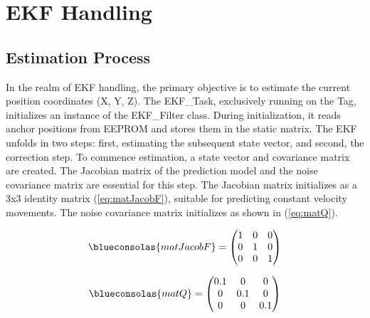 \chapter{EKF Handling}
\label{chap:EKF_Handling}

\section{Estimation Process}
\label{sec:Estimation_Process}

In the realm of EKF handling, the primary objective is to estimate the current position coordinates (X, Y, Z). The EKF\_Task, exclusively running on the Tag, initializes an instance of the EKF\_Filter class. During initialization, it reads anchor positions from EEPROM and stores them in the static  matrix.
\vspace{4pt}
\newline
The EKF unfolds in two steps: first, estimating the subsequent state vector, and second, the correction step. To commence estimation, a state vector and covariance matrix are created. The Jacobian matrix of the prediction model and the noise covariance matrix are essential for this step. The Jacobian matrix  initializes as a 3x3 identity matrix (\ref{eq:matJacobF}), suitable for predicting constant velocity movements. The noise covariance matrix  initializes as shown in (\ref{eq:matQ}).

\begin{equation}
	\begin{centering}
		\blueconsolas{matJacobF} =
		\begin{pmatrix}
			1 & 0 & 0 \\
			0 & 1 & 0 \\
			0 & 0 & 1
		\end{pmatrix}
	\end{centering}
	\label{eq:matJacobF}
\end{equation}

\begin{equation}
	\begin{centering}
		\blueconsolas{matQ} =
		\begin{pmatrix}
			0.1 & 0 & 0 \\
			0 & 0.1 & 0 \\
			0 & 0 & 0.1
		\end{pmatrix}
	\end{centering}
	\label{eq:matQ}
\end{equation}

